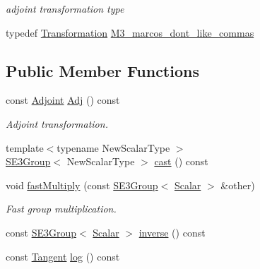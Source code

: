 \begin{DoxyCompactItemize}
\begin{DoxyCompactList}\small\item\em adjoint transformation type \end{DoxyCompactList}\item 
typedef \hyperlink{class_sophus_1_1_s_e3_group_base_a426ebd53f324a4fd6d36c28028f967f1}{Transformation} \hyperlink{class_sophus_1_1_s_e3_group_base_a4a50d722144fb9350ef4beaa975e45b4}{M3\+\_\+marcos\+\_\+dont\+\_\+like\+\_\+commas}
\end{DoxyCompactItemize}
\subsection*{Public Member Functions}
\begin{DoxyCompactItemize}
\item 
const \hyperlink{class_sophus_1_1_s_e3_group_base_ac2e0179cb3e9490604c417d8e59a92d3}{Adjoint} \hyperlink{class_sophus_1_1_s_e3_group_base_a91e42ad94f6afcfec6784cb081d4e7c6}{Adj} () const 
\begin{DoxyCompactList}\small\item\em Adjoint transformation. \end{DoxyCompactList}\item 
{\footnotesize template$<$typename New\+Scalar\+Type $>$ }\\\hyperlink{class_sophus_1_1_s_e3_group}{S\+E3\+Group}$<$ New\+Scalar\+Type $>$ \hyperlink{class_sophus_1_1_s_e3_group_base_abb7b5dbc57317547710d3c6fb6fd8484}{cast} () const 
\item 
void \hyperlink{class_sophus_1_1_s_e3_group_base_a8edad34d74f5dd68800601e71be7bc4c}{fast\+Multiply} (const \hyperlink{class_sophus_1_1_s_e3_group}{S\+E3\+Group}$<$ \hyperlink{class_sophus_1_1_s_e3_group_base_aa3db86a2cabe32d3c299dda41af181cc}{Scalar} $>$ \&other)
\begin{DoxyCompactList}\small\item\em Fast group multiplication. \end{DoxyCompactList}\item 
const \hyperlink{class_sophus_1_1_s_e3_group}{S\+E3\+Group}$<$ \hyperlink{class_sophus_1_1_s_e3_group_base_aa3db86a2cabe32d3c299dda41af181cc}{Scalar} $>$ \hyperlink{class_sophus_1_1_s_e3_group_base_a1b47e7c7329fecdc289f95094248ccfe}{inverse} () const 
\item 
const \hyperlink{class_sophus_1_1_s_e3_group_base_a45f63b562f0614853cef2c04c4cd5f2b}{Tangent} \hyperlink{class_sophus_1_1_s_e3_group_base_a5a93392e6c30368a9e8540b2cabf02e8}{log} () const 

\end{DoxyCompactItemize}

